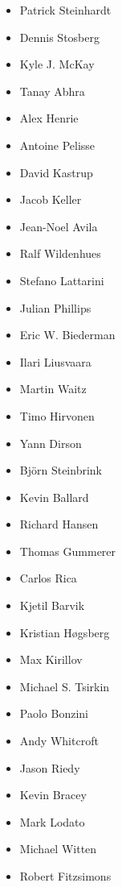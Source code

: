 \begin{frame}
{\begin{multicols}{7}
\begin{itemize}
                \item[] Patrick Steinhardt
                \item[] Dennis Stosberg
                \item[] Kyle J. McKay
                \item[] Tanay Abhra
                \item[] Alex Henrie
                \item[] Antoine Pelisse
                \item[] David Kastrup
                \item[] Jacob Keller
                \item[] Jean-Noel Avila
                \item[] Ralf Wildenhues
                \item[] Stefano Lattarini
                \item[] Julian Phillips
                \item[] Eric W. Biederman
                \item[] Ilari Liusvaara
                \item[] Martin Waitz
                \item[] Timo Hirvonen
                \item[] Yann Dirson
                \item[] Björn Steinbrink
                \item[] Kevin Ballard
                \item[] Richard Hansen
                \item[] Thomas Gummerer
                \item[] Carlos Rica
                \item[] Kjetil Barvik
                \item[] Kristian Høgsberg
                \item[] Max Kirillov
                \item[] Michael S. Tsirkin
                \item[] Paolo Bonzini
                \item[] Andy Whitcroft
                \item[] Jason Riedy
                \item[] Kevin Bracey
                \item[] Mark Lodato
                \item[] Michael Witten
                \item[] Robert Fitzsimons

\end{itemize}
\end{multicols}}
\end{frame}
